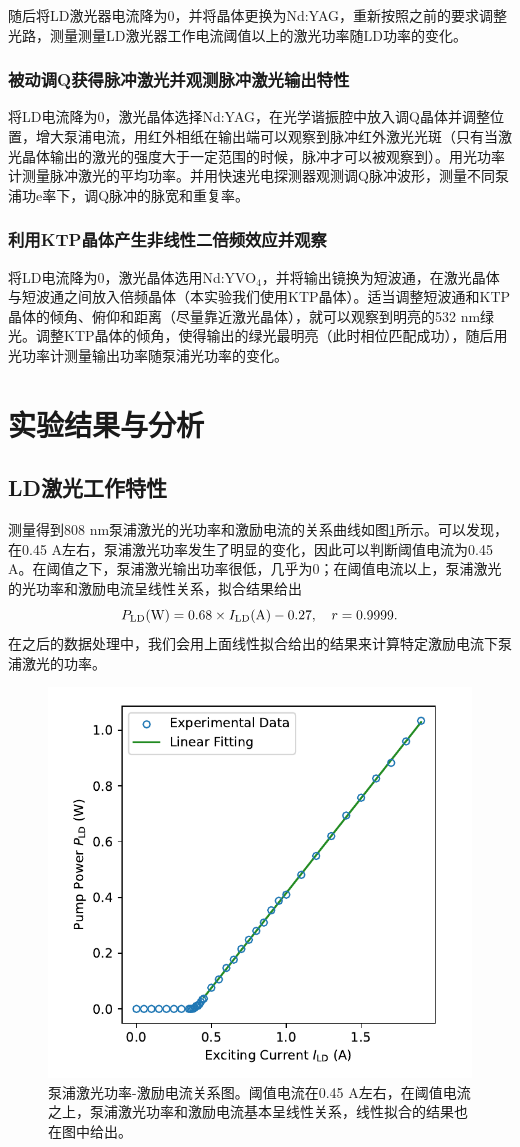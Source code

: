 \documentclass{mpltx}
\begin{document}
随后将LD激光器电流降为0，并将晶体更换为Nd:YAG，重新按照之前的要求调整光路，测量测量LD激光器工作电流阈值以上的激光功率随LD功率的变化。
\subsubsection{被动调Q获得脉冲激光并观测脉冲激光输出特性}
将LD电流降为0，激光晶体选择Nd:YAG，在光学谐振腔中放入调Q晶体并调整位置，增大泵浦电流，用红外相纸在输出端可以观察到脉冲红外激光光斑（只有当激光晶体输出的激光的强度大于一定范围的时候，脉冲才可以被观察到）。用光功率计测量脉冲激光的平均功率。并用快速光电探测器观测调Q脉冲波形，测量不同泵浦功e率下，调Q脉冲的脉宽和重复率。
\subsubsection{利用KTP晶体产生非线性二倍频效应并观察}
将LD电流降为0，激光晶体选用Nd:YVO$_4$，并将输出镜换为短波通，在激光晶体与短波通之间放入倍频晶体（本实验我们使用KTP晶体）。适当调整短波通和KTP晶体的倾角、俯仰和距离（尽量靠近激光晶体），就可以观察到明亮的532 nm绿光。调整KTP晶体的倾角，使得输出的绿光最明亮（此时相位匹配成功），随后用光功率计测量输出功率随泵浦光功率的变化。
\section{实验结果与分析}
\subsection{LD激光工作特性}
测量得到808 nm泵浦激光的光功率和激励电流的关系曲线如图\ref{fig:PLD_I}所示。可以发现，在0.45 A左右，泵浦激光功率发生了明显的变化，因此可以判断阈值电流为0.45 A。在阈值之下，泵浦激光输出功率很低，几乎为0；在阈值电流以上，泵浦激光的光功率和激励电流呈线性关系，拟合结果给出
\begin{equation}\label{eq:PLD_I}
  P_{\rm LD}({\rm W})=0.68\times I_{\rm LD}({\rm A})-0.27,\quad r=0.9999.
\end{equation}
在之后的数据处理中，我们会用上面线性拟合给出的结果来计算特定激励电流下泵浦激光的功率。
\begin{figure}[h]
  \centering
  \includegraphics[width=0.6\linewidth]{fig/PLD_I.pdf}
  \caption{泵浦激光功率-激励电流关系图。阈值电流在0.45 A左右，在阈值电流之上，泵浦激光功率和激励电流基本呈线性关系，线性拟合的结果也在图中给出。}
  \label{fig:PLD_I}
\end{figure}
\end{document}
